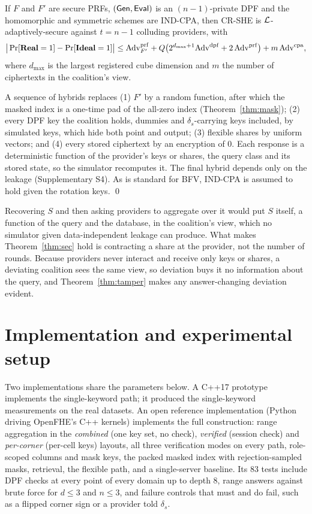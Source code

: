 \begin{theorem}
\label{thm:sec}
If $F$ and $F'$ are secure PRFs, $(\mathsf{Gen},\mathsf{Eval})$ is an $(n{-}1)$-private DPF and
the homomorphic and symmetric schemes are IND-CPA, then CR-SHE is
$\mathcal{L}$-adaptively-secure against $t=n-1$ colluding providers, with
\[
\big|\Pr[\mathbf{Real}=1]-\Pr[\mathbf{Ideal}=1]\big|\le\mathrm{Adv}^{\mathrm{prf}}_{F'}
+Q\big(2^{d_{\max}+1}\mathrm{Adv}^{\mathrm{dpf}}+2\,\mathrm{Adv}^{\mathrm{prf}}\big)+m\,\mathrm{Adv}^{\mathrm{cpa}} ,
\]
where $d_{\max}$ is the largest registered cube dimension and $m$ the number of
ciphertexts in the coalition's view.
\end{theorem}
\begin{pf}
A sequence of hybrids replaces (1) $F'$ by a random function, after which the
masked index is a one-time pad of the all-zero index (Theorem~\ref{thm:mask});
(2) every DPF key the coalition holds, dummies and $\delta_s$-carrying keys
included, by simulated keys, which hide both point and output; (3) flexible
shares by uniform vectors; and (4) every stored ciphertext by an encryption of
$0$. Each response is a deterministic function of the provider's keys or shares,
the query class and its stored state, so the simulator recomputes it. The final
hybrid depends only on the leakage (Supplementary S4). As is standard for BFV,
IND-CPA is assumed to hold given the rotation keys. \qed
\end{pf}

Recovering $S$ and then asking providers to aggregate over it would put $S$
itself, a function of the query and the database, in the coalition's view,
which no simulator given data-independent leakage can produce. What makes
Theorem~\ref{thm:sec} hold is contracting a share at the provider, not the
number of rounds. Because providers never interact and receive only keys or
shares, a deviating coalition sees the same view, so deviation buys it no
information about the query, and Theorem~\ref{thm:tamper} makes any
answer-changing deviation evident.

\section{Implementation and experimental setup}
\label{sec:impl}
Two implementations share the parameters below. A C++17 prototype implements
the single-keyword path; it produced the single-keyword measurements on the
real datasets. An open reference implementation (Python driving OpenFHE's C++
kernels) implements the full construction: range aggregation in the
\emph{combined} (one key set, no check), \emph{verified} (session check) and
\emph{per-corner} (per-cell keys) layouts, all three verification modes on
every path, role-scoped columns and mask keys, the packed masked index with
rejection-sampled masks, retrieval, the flexible path, and a single-server
baseline. Its 83 tests include DPF checks at every point of every domain up to
depth 8, range answers against brute force for $d\le3$ and $n\le3$, and failure
controls that must and do fail, such as a flipped corner sign or a provider
told $\delta_s$.

